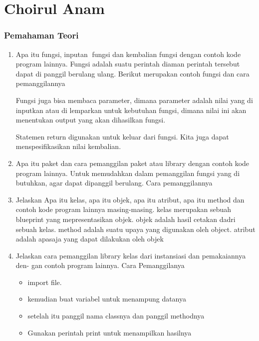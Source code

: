 \section{Choirul Anam}
\subsubsection{Pemahaman Teori}
\begin{enumerate}
    \item Apa itu fungsi, inputan fungsi dan kembalian fungsi dengan contoh kode program
    lainnya.
    Fungsi adalah suatu perintah diaman perintah tersebut dapat di panggil berulang ulang.
    Berikut merupakan contoh fungsi dan cara pemanggilannya
    

    Fungsi juga bisa membaca parameter, dimana parameter adalah nilai yang di inputkan atau di lemparkan untuk kebutuhan fungsi, dimana nilai ini akan menentukan output yang akan dihasilkan fungsi.
    

    Statemen return digunakan untuk keluar dari fungsi. Kita juga dapat menspesifikasikan nilai kembalian.
    

    \item Apa itu paket dan cara pemanggilan paket atau library dengan contoh kode
    program lainnya.
    Untuk memudahkan dalam pemanggilan fungsi yang di butuhkan, agar dapat dipanggil berulang.
    Cara pemanggilannya
    

    \item Jelaskan Apa itu kelas, apa itu objek, apa itu atribut, apa itu method dan
    contoh kode program lainnya masing-masing.
    kelas merupakan sebuah blueprint yang mepresentasikan objek.
    objek adalah hasil cetakan dadri sebuah kelas.
    method adalah suatu upaya yang digunakan oleh object.
    atribut adalah apasaja yang dapat dilakukan oleh objek
    

    \item Jelaskan cara pemanggilan library kelas dari instansiasi dan pemakaiannya den-
    gan contoh program lainnya.
    Cara Pemanggilanya 
    \begin{itemize}
        \item import file.
        \item kemudian buat variabel untuk menampung datanya
        \item setelah itu panggil nama classnya dan panggil methodnya
        \item Gunakan perintah print untuk menampilkan hasilnya


\end{itemize}
\end{enumerate}
